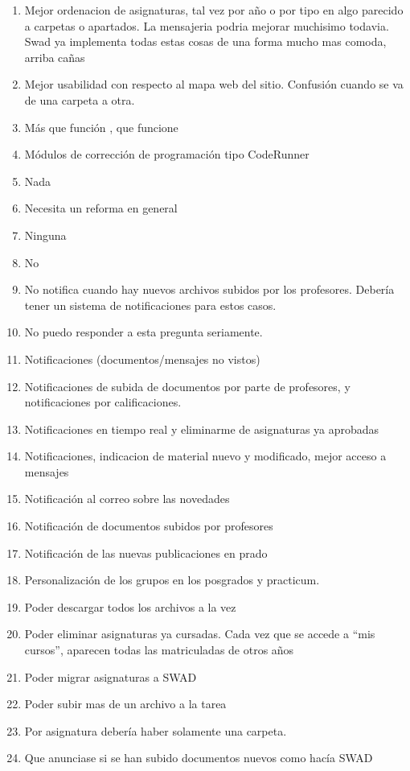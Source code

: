 \begin{enumerate}
\item Mejor ordenacion de asignaturas, tal vez por año o por tipo en algo parecido a carpetas o apartados. La mensajeria podria mejorar muchisimo todavia. Swad ya implementa todas estas cosas de una forma mucho mas comoda, arriba cañas
\item Mejor usabilidad con respecto al mapa web del sitio. Confusión cuando se va de una carpeta a otra.
\item Más que función , que funcione
\item Módulos de corrección de programación tipo CodeRunner
\item Nada
\item Necesita un reforma en general
\item Ninguna
\item No
\item No notifica cuando hay nuevos archivos subidos por los profesores. Debería tener un sistema de notificaciones para estos casos.
\item No puedo responder a esta pregunta seriamente.
\item Notificaciones (documentos/mensajes no vistos)
\item Notificaciones de subida de documentos por parte de profesores, y notificaciones por calificaciones.
\item Notificaciones en tiempo real y eliminarme de asignaturas ya aprobadas
\item Notificaciones, indicacion de material nuevo y modificado, mejor acceso a mensajes
\item Notificación al correo sobre las novedades
\item Notificación de documentos subidos por profesores
\item Notificación de las nuevas publicaciones en prado
\item Personalización de los grupos en los posgrados y practicum.
\item Poder descargar todos los archivos a la vez
\item Poder eliminar asignaturas ya cursadas. Cada vez que se accede a ``mis cursos'', aparecen todas las matriculadas de otros años
\item Poder migrar asignaturas a SWAD
\item Poder subir mas de un archivo a la tarea
\item Por asignatura debería haber solamente una carpeta.
\item Que anunciase si se han subido documentos nuevos como hacía SWAD

\end{enumerate}

